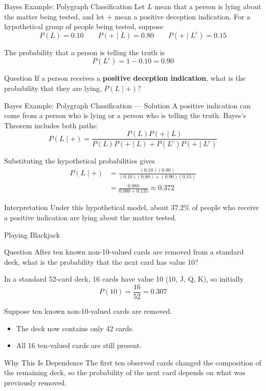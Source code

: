 \documentclass[aspectratio=169]{beamer}
\begin{document}
\begin{frame}{Bayes Example: Polygraph Classification}
Let $L$ mean that a person is lying about the matter being tested, and let $+$ mean a positive deception indication. For a hypothetical group of people being tested, suppose
$$P(L)=0.10 \qquad P(+\mid L)=0.80 \qquad P(+\mid L^c)=0.15$$

The probability that a person is telling the truth is
$$P(L^c)=1-0.10=0.90$$

\begin{block}{Question}
If a person receives a \textbf{positive deception indication}, what is the probability that they are lying, $P(L\mid +)$?
\end{block}
\end{frame}

\begin{frame}{Bayes Example: Polygraph Classification --- Solution}
A positive indication can come from a person who is lying or a person who is telling the truth. Bayes's Theorem includes both paths:
$$P(L\mid +)=\frac{P(L)P(+\mid L)}{P(L)P(+\mid L)+P(L^c)P(+\mid L^c)}$$

Substituting the hypothetical probabilities gives
$$
\begin{aligned}
P(L\mid +)
&=\frac{(0.10)(0.80)}{(0.10)(0.80)+(0.90)(0.15)}\\
&=\frac{0.080}{0.080+0.135} \approx\boxed{0.372}
\end{aligned}
$$

\begin{block}{Interpretation}
Under this hypothetical model, about $37.2\%$ of people who receive a positive indication are lying about the matter tested.
\end{block}
\end{frame}

\begin{frame}{Playing Blackjack}
\begin{block}{Question}
After ten known non-10-valued cards are removed from a standard deck, what is the probability that the next card has value 10?
\end{block}

In a standard 52-card deck, 16 cards have value 10 (10, J, Q, K), so initially
$$P(10)=\frac{16}{52}=\mathbf{0.307}$$

Suppose ten known non-10-valued cards are removed.
\begin{itemize}
	\item The deck now contains only 42 cards.
	\item All 16 ten-valued cards are still present.
\end{itemize}

\begin{block}{Why This Is Dependence}
The first ten observed cards changed the composition of the remaining deck, so the probability of the next card depends on what was previously removed.
\end{block}
\end{frame}
\end{document}
